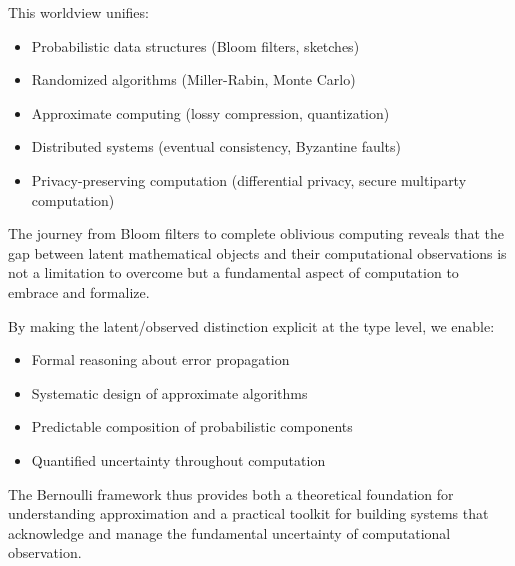 This worldview unifies:
\begin{itemize}
\item Probabilistic data structures (Bloom filters, sketches)
\item Randomized algorithms (Miller-Rabin, Monte Carlo)
\item Approximate computing (lossy compression, quantization)
\item Distributed systems (eventual consistency, Byzantine faults)
\item Privacy-preserving computation (differential privacy, secure multiparty computation)
\end{itemize}

The journey from Bloom filters to complete oblivious computing reveals that the gap between latent mathematical objects and their computational observations is not a limitation to overcome but a fundamental aspect of computation to embrace and formalize.

By making the latent/observed distinction explicit at the type level, we enable:
\begin{itemize}
\item Formal reasoning about error propagation
\item Systematic design of approximate algorithms
\item Predictable composition of probabilistic components
\item Quantified uncertainty throughout computation
\end{itemize}

The Bernoulli framework thus provides both a theoretical foundation for understanding approximation and a practical toolkit for building systems that acknowledge and manage the fundamental uncertainty of computational observation.